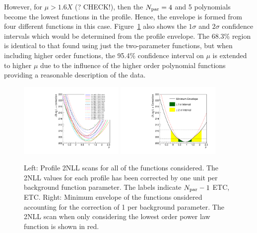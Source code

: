 However, for $\mu> 1.6X$ (? CHECK!),
then the $N_{\rm par}=4$ and 5 polynomials become the lowest functions in the
profile. Hence, the envelope is formed from four different functions in this
case. Figure~\ref{fig:correction:profiles} also shows the $1\sigma$ and 
$2\sigma$ confidence intervals which would be determined from the 
profile envelope. The 68.3\% region is identical to that found using
just the two-parameter functions, but
when including higher order functions, the 95.4\% confidence interval on $\mu$ is extended to higher $\mu$
due to the influence of the higher order polynomial functions providing a reasonable 
description of the data.

\begin{figure}[tbp]
\centering
\includegraphics[width=0.45\textwidth]{correction/ProfilesAllOrders.pdf}
\includegraphics[width=0.45\textwidth]{correction/EnvelopeAllOrders.pdf}
\caption{Left: Profile 2NLL scans for all of the functions considered. The 2NLL values for
each profile has been corrected by one unit per background function parameter.
The labels indicate $N_{\rm par}-1$ ETC, ETC. 
Right: Minimum envelope of the functions onsidered accounting for the correction of 1 per 
background parameter. The 2NLL scan when only considering the lowest order power law function 
is shown in red.}
\label{fig:correction:profiles}
\end{figure}



